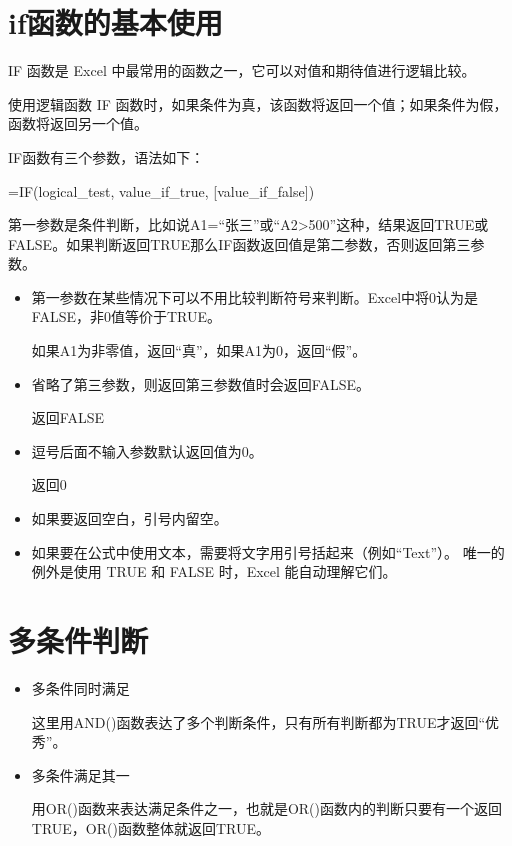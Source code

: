 \section{if函数的基本使用}

IF 函数是 Excel 中最常用的函数之一，它可以对值和期待值进行逻辑比较。

使用逻辑函数 IF 函数时，如果条件为真，该函数将返回一个值；如果条件为假，函数将返回另一个值。


IF函数有三个参数，语法如下：

=IF(logical\_test, value\_if\_true, [value\_if\_false])


第一参数是条件判断，比如说A1=``张三''或``A2>500''这种，结果返回TRUE或FALSE。如果判断返回TRUE那么IF函数返回值是第二参数，否则返回第三参数。

\begin{itemize}
    \item 第一参数在某些情况下可以不用比较判断符号来判断。Excel中将0认为是FALSE，非0值等价于TRUE。
    
    
    如果A1为非零值，返回``真''，如果A1为0，返回``假''。
    \item 省略了第三参数，则返回第三参数值时会返回FALSE。
    

    返回FALSE
    \item 逗号后面不输入参数默认返回值为0。
    

    返回0
    \item 如果要返回空白，引号内留空。
    
    
    \item 如果要在公式中使用文本，需要将文字用引号括起来（例如``Text''）。 唯一的例外是使用 TRUE 和 FALSE 时，Excel 能自动理解它们。
\end{itemize}

\section{多条件判断}

\begin{itemize}
    \item 多条件同时满足
    

    这里用AND()函数表达了多个判断条件，只有所有判断都为TRUE才返回``优秀''。
    \item 多条件满足其一
    

    用OR()函数来表达满足条件之一，也就是OR()函数内的判断只要有一个返回TRUE，OR()函数整体就返回TRUE。
\end{itemize}

